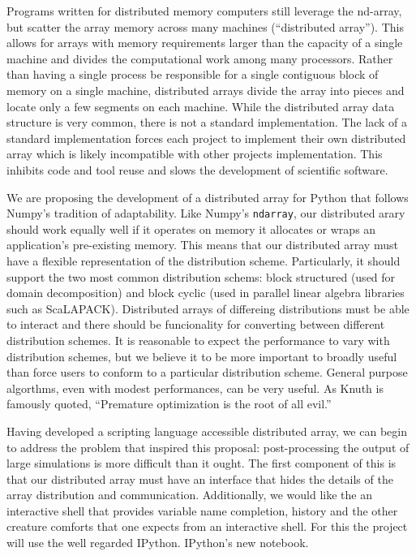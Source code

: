 \documentclass[letterpaper,11pt]{article}
\begin{document}
Programs written for distributed memory computers still leverage the nd-array, but scatter the array memory across many machines (``distributed array'').  This allows for arrays with memory requirements larger than the capacity of a single machine and divides the computational work among many processors.  Rather than having a single process be responsible for a single contiguous block of memory on a single machine, distributed arrays divide the array into pieces and locate only a few segments on each machine.  While the distributed array data structure is very common, there is not a standard implementation.  The lack of a standard implementation forces each project to implement their own distributed array which is likely incompatible with other projects implementation.  This inhibits code and tool reuse and slows the development of scientific software.

We are proposing the development of a distributed array for Python that follows Numpy's tradition of adaptability.  Like Numpy's \texttt{ndarray}, our distributed arary should work equally well if it operates on memory it allocates or wraps an application's pre-existing memory.  This means that our distributed array must have a flexible representation of the distribution scheme.  Particularly, it should support the two most common distribution schems: block structured (used for domain decomposition) and block cyclic (used in parallel linear algebra libraries such as ScaLAPACK\cite{scalapack}).  Distributed arrays of differeing distributions must be able to interact and there should be funcionality for converting between different distribution schemes.  It is reasonable to expect the performance to vary with distribution schemes, but we believe it to be more important to broadly useful than force users to conform to a particular distribution scheme.  General purpose algorthms, even with modest performances, can be very useful.  As Knuth is famously quoted, ``Premature optimization is the root of all evil.''\cite{Knuth1974}

Having developed a scripting language accessible distributed array, we can begin to address the problem that inspired this proposal: post-processing the output of large simulations is more difficult than it ought.  The first component of this is that our distributed array must have an interface that hides the details of the array distribution and communication.  Additionally, we would like the an interactive shell that provides variable name completion, history and the other creature comforts that one expects from an interactive shell.  For this the project will use the well regarded IPython.  IPython's new notebook\cite{ipython-notebook}.
\end{document}
